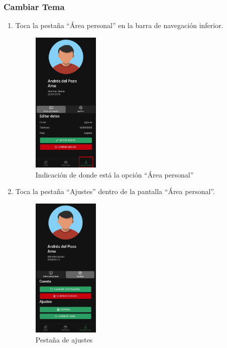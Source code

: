 \subsubsection{Cambiar Tema}
\begin{enumerate}
	\item Toca la pestaña “Área personal” en la barra de navegación inferior.
	      \begin{figure}[H]
		      \centering
		      \includegraphics[width=0.3\textwidth]{7-Construccion/Manuales/app/P1-Perfil.png}
		      \caption{Indicación de donde está la opción “Área personal” }
	      \end{figure}
	\item Toca la pestaña “Ajustes” dentro de la pantalla “Área personal”.
	      \begin{figure}[H]
		      \centering
		      \includegraphics[width=0.3\textwidth]{7-Construccion/Manuales/app/P4-Perfil.png}
		      \caption{Pestaña de ajustes}

\end{figure}
\end{enumerate}
